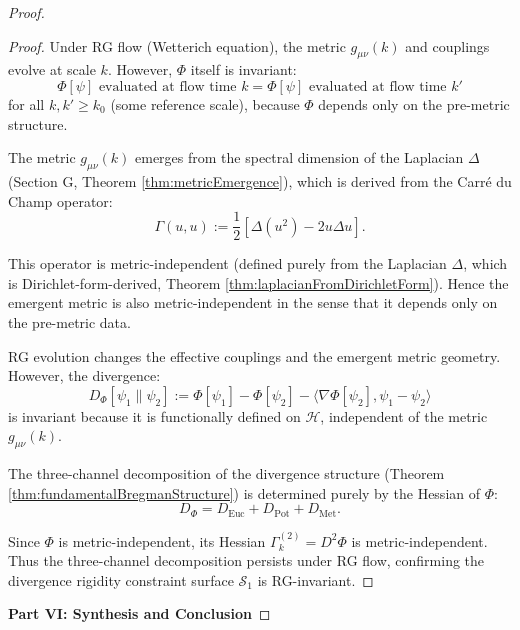 \begin{proof}
\begin{lemma}
\begin{proof}
Under RG flow (Wetterich equation), the metric $g_{\mu\nu}(k)$ and couplings evolve at scale $k$. However, $\Phi$ itself is invariant:
\begin{equation}
\Phi[\psi] \text{ evaluated at flow time } k = \Phi[\psi] \text{ evaluated at flow time } k'
\end{equation}
for all $k, k' \geq k_0$ (some reference scale), because $\Phi$ depends only on the pre-metric structure.

The metric $g_{\mu\nu}(k)$ emerges from the spectral dimension of the Laplacian $\Delta$ (Section G, Theorem \ref{thm:metricEmergence}), which is derived from the Carré du Champ operator:
\begin{equation}
\Gamma(u, u) := \frac{1}{2}[\Delta(u^2) - 2u\Delta u].
\end{equation}

This operator is metric-independent (defined purely from the Laplacian $\Delta$, which is Dirichlet-form-derived, Theorem \ref{thm:laplacianFromDirichletForm}). Hence the emergent metric is also metric-independent in the sense that it depends only on the pre-metric data.

RG evolution changes the effective couplings and the emergent metric geometry. However, the divergence:
\begin{equation}
D_\Phi[\psi_1 \| \psi_2] := \Phi[\psi_1] - \Phi[\psi_2] - \langle \nabla \Phi[\psi_2], \psi_1 - \psi_2 \rangle
\end{equation}
is invariant because it is functionally defined on $\mathcal{H}$, independent of the metric $g_{\mu\nu}(k)$.

The three-channel decomposition of the divergence structure (Theorem \ref{thm:fundamentalBregmanStructure}) is determined purely by the Hessian of $\Phi$:
\begin{equation}
D_\Phi = D_{\mathrm{Euc}} + D_{\mathrm{Pot}} + D_{\mathrm{Met}}.
\end{equation}

Since $\Phi$ is metric-independent, its Hessian $\Gamma_k^{(2)} = D^2 \Phi$ is metric-independent. Thus the three-channel decomposition persists under RG flow, confirming the divergence rigidity constraint surface $\mathcal{S}_1$ is RG-invariant.

\end{proof}

\end{lemma}

\noindent\textbf{Part VI: Synthesis and Conclusion}


\end{proof}
